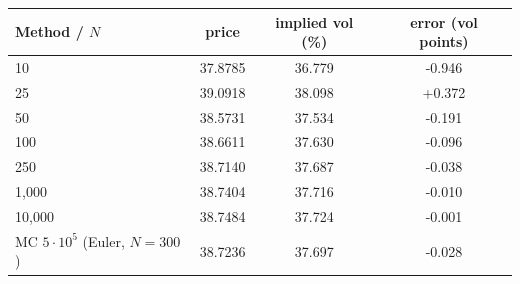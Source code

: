 \begin{tabular}{lccc}
\toprule
Method / $N$ & price & implied vol (\%) & error (vol points) \\
\midrule
10 & 37.8785 & 36.779 & -0.946 \\
25 & 39.0918 & 38.098 & +0.372 \\
50 & 38.5731 & 37.534 & -0.191 \\
100 & 38.6611 & 37.630 & -0.096 \\
250 & 38.7140 & 37.687 & -0.038 \\
1,000 & 38.7404 & 37.716 & -0.010 \\
10,000 & 38.7484 & 37.724 & -0.001 \\
MC $5\cdot10^5$ (Euler, $N=300$) & 38.7236 & 37.697 & -0.028 \\
\bottomrule
\end{tabular}
